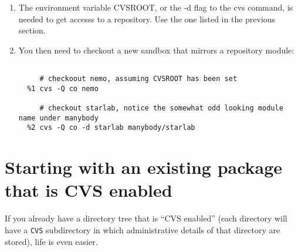 \begin{enumerate}

\item The environment variable CVSROOT, or the -d flag to the cvs command,
is needed to get accesss to a repository. Use the one listed in the
previous section.  

\item You then need to checkout a new sandbox that mirrors a repository
module:
\footnotesize\begin{verbatim}

     # checkoout nemo, assuming CVSROOT has been set
  %1 cvs -Q co nemo

     # checkout starlab, notice the somewhat odd looking module name under manybody
  %2 cvs -Q co -d starlab manybody/starlab

\end{verbatim}\normalsize




\end{enumerate}


\section{Starting with an existing package that is CVS enabled}

If you already have a directory tree that is ``CVS enabled'' (each
directory will have a {\tt CVS} subdirectory in which administrative
details of that directory are stored), life is even easier.

